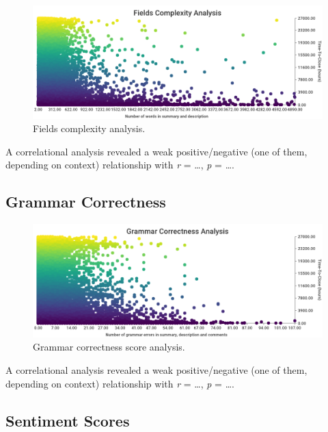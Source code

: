 \documentclass{mpaper}
\begin{document}
\begin{figure}[ht]
  \begin{center}
    \includegraphics[scale=0.23]{images/fields_complexity.png}
  \end{center}
  \caption{\label{fields}Fields complexity analysis.}
\end{figure}

A correlational analysis revealed a weak positive/negative (one of them, depending on context) relationship
with \emph{r} = \dots, \emph{p} = \dots.

\subsection{Grammar Correctness}

\begin{figure}[ht]
  \begin{center}
    \includegraphics[scale=0.23]{images/grammar_correctness.png}
  \end{center}
  \caption{\label{grammar}Grammar correctness score analysis.}
\end{figure}

A correlational analysis revealed a weak positive/negative (one of them, depending on context) relationship
with \emph{r} = \dots, \emph{p} = \dots.

\subsection{Sentiment Scores}
\end{document}
